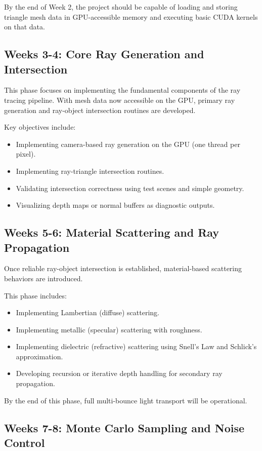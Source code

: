 \documentclass[11pt]{article}
\begin{document}
By the end of Week 2, the project should be capable of loading and storing triangle mesh data in GPU-accessible memory and executing basic CUDA kernels on that data.

\subsection*{Weeks 3-4: Core Ray Generation and Intersection}

This phase focuses on implementing the fundamental components of the ray tracing pipeline. With mesh data now accessible on the GPU, primary ray generation and ray-object intersection routines are developed.

Key objectives include:
\begin{itemize}
    \item Implementing camera-based ray generation on the GPU (one thread per pixel).
    \item Implementing ray-triangle intersection routines.
    \item Validating intersection correctness using test scenes and simple geometry.
    \item Visualizing depth maps or normal buffers as diagnostic outputs.
\end{itemize}

\subsection*{Weeks 5-6: Material Scattering and Ray Propagation}

Once reliable ray-object intersection is established, material-based scattering behaviors are introduced.

This phase includes:
\begin{itemize}
    \item Implementing Lambertian (diffuse) scattering.
    \item Implementing metallic (specular) scattering with roughness.
    \item Implementing dielectric (refractive) scattering using Snell's Law and Schlick's approximation.
    \item Developing recursion or iterative depth handling for secondary ray propagation.
\end{itemize}

By the end of this phase, full multi-bounce light transport will be operational.

\subsection*{Weeks 7-8: Monte Carlo Sampling and Noise Control}
\end{document}
